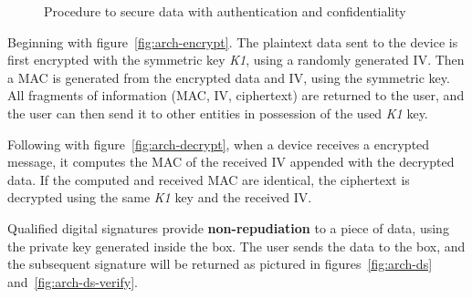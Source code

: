 \begin{figure}[h]
	\centering     %
	\caption{Procedure to secure data with authentication and confidentiality}
\end{figure}

Beginning with figure~\ref{fig:arch-encrypt}. The plaintext data sent to the device is first encrypted with the symmetric key \textit{K1}, using a randomly generated \ac{IV}. Then a \ac{MAC} is generated from the encrypted data and \ac{IV}, using the symmetric key. All fragments of information (MAC, IV, ciphertext) are returned to the user, and the user can then send it to other entities in possession of the used \textit{K1} key.

Following with figure~\ref{fig:arch-decrypt}, when a device receives a encrypted message, it computes the MAC of the received \ac{IV} appended with the decrypted data. If the computed and received \ac{MAC} are identical, the ciphertext is decrypted using the same \textit{K1} key and the received \ac{IV}.

Qualified digital signatures provide \textbf{non-repudiation} to a piece of data, using the private key generated inside the box. The user sends the data to the box, and the subsequent signature will be returned as pictured in figures~\ref{fig:arch-ds} and~\ref{fig:arch-ds-verify}.

